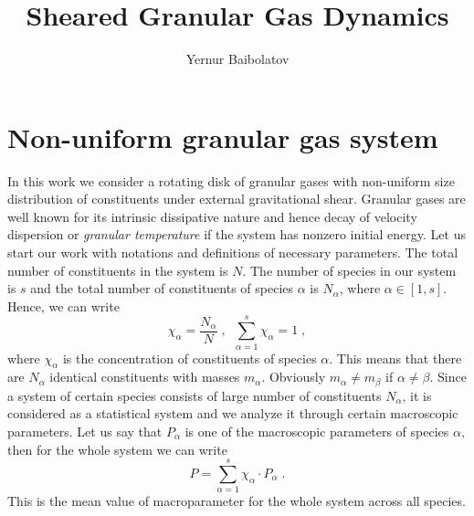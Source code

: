 \documentclass[preprint, aps, pra]{revtex4-1}
\begin{document}
  \title{Sheared Granular Gas Dynamics}
  \author{Yernur Baibolatov}
  \maketitle
  
\section{Non-uniform granular gas system}
 In this work we consider a rotating disk of granular gases with non-uniform size distribution of constituents
 under external gravitational shear. Granular gases are well known for its intrinsic dissipative nature and hence
 decay of velocity dispersion or \emph{granular temperature} if the system has nonzero initial energy. Let us start
 our work with notations and definitions of necessary parameters. The total number of constituents in the system is $N$.
 The number of species in our system is $s$ and the total number of constituents of species $\alpha$ is $N_\alpha$, 
 where $\alpha\in[1,s]$.
 Hence, we can write
 \begin{equation}
   \chi_\alpha=\frac{N_\alpha}{N}\;,\,\,\,\sum_{\alpha=1}^{s}\chi_\alpha=1\;,
 \end{equation}
 where $\chi_\alpha$ is the concentration of constituents of species $\alpha$.
This means that there are $N_\alpha$ identical constituents with masses $m_\alpha$. 
Obviously $m_\alpha\neq m_\beta$ if $\alpha\neq\beta$. Since a system of certain species consists of large number
of constituents $N_\alpha$, it is considered as a statistical system and we analyze it through certain macroscopic parameters.
Let us say that $P_\alpha$ is one of the macroscopic parameters of species $\alpha$, then for the whole system we can write
\begin{equation}\label{eq:macroparameter_discrete}
  P = \sum_{\alpha=1}^{s}\chi_\alpha\cdot P_\alpha\;.
\end{equation}
This is the mean value of macroparameter for the whole system across all species.
\end{document}
